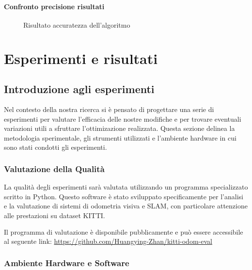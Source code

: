 \documentclass[12pt,a4paper]{report}
\begin{document}
\subsubsection{Confronto precisione risultati}

\begin{figure}[H]
    \centering
    \caption{Risultato accuratezza dell'algoritmo}
\end{figure}

\chapter{Esperimenti e risultati}

\section{Introduzione agli esperimenti}

Nel contesto della nostra ricerca si è pensato di progettare una serie di esperimenti per valutare l'efficacia delle nostre modifiche e per trovare eventuali variazioni utili a sfruttare l'ottimizazione realizzata. Questa sezione delinea la metodologia sperimentale, gli strumenti utilizzati e l'ambiente hardware in cui sono stati condotti gli esperimenti.

\subsection{Valutazione della Qualità}

La qualità degli esperimenti sarà valutata utilizzando un programma specializzato scritto in Python. Questo software è stato sviluppato specificamente per l'analisi e la valutazione di sistemi di odometria visiva e SLAM, con particolare attenzione alle prestazioni su dataset KITTI.

Il programma di valutazione è disponibile pubblicamente e può essere accessibile al seguente link:
\url{https://github.com/Huangying-Zhan/kitti-odom-eval}

\subsection{Ambiente Hardware e Software}
\end{document}
